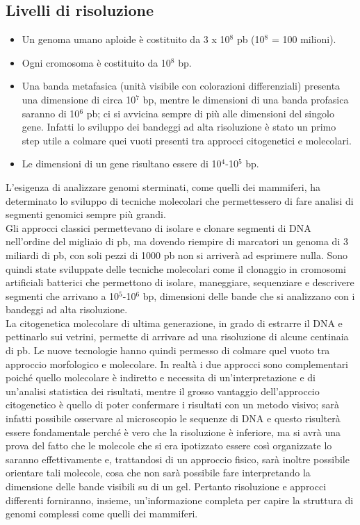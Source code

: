 \documentclass[11pt]{book}
\begin{document}
\subsection{Livelli di risoluzione}
\begin{itemize}
\item 
Un genoma umano aploide è costituito da 3 x 10\(^8\) pb (10\(^8\) = 100 milioni).
\item
Ogni cromosoma è costituito da 10\(^8\) bp.
\item
Una banda metafasica (unità visibile con colorazioni differenziali) presenta una dimensione di circa 10\(^7\) bp, mentre le dimensioni di una banda profasica saranno di 10\(^6\) pb; ci si avvicina sempre di più alle dimensioni del singolo gene.
Infatti lo sviluppo dei bandeggi ad alta risoluzione è stato un primo step utile a colmare quei vuoti presenti tra approcci citogenetici e molecolari.
\item
Le dimensioni di un gene risultano essere di 10\(^4\)-10\(^5\) bp.
\end{itemize}

L’esigenza di analizzare genomi sterminati, come quelli dei mammiferi, ha determinato lo sviluppo di tecniche molecolari che permettessero di fare analisi di segmenti genomici sempre più grandi.\\
Gli approcci classici permettevano di isolare e clonare segmenti di DNA nell’ordine del migliaio di pb, ma dovendo riempire di marcatori un genoma di 3 miliardi di pb, con soli pezzi di 1000 pb non si arriverà ad esprimere nulla. Sono quindi state sviluppate delle tecniche molecolari come il clonaggio in cromosomi artificiali batterici che permettono di isolare, maneggiare, sequenziare e descrivere segmenti che arrivano a 10\(^5\)-10\(^6\) bp, dimensioni delle bande che si analizzano con i bandeggi ad alta risoluzione.\\
La citogenetica molecolare di ultima generazione, in grado di estrarre il DNA e pettinarlo sui vetrini, permette di arrivare ad una risoluzione di alcune centinaia di pb. Le nuove tecnologie hanno quindi permesso di colmare quel vuoto tra approccio morfologico e molecolare. 
In realtà i due approcci sono complementari poiché quello molecolare è indiretto e necessita di un’interpretazione e di un’analisi statistica dei risultati, mentre il grosso vantaggio dell’approccio citogenetico è quello di poter confermare i risultati con un metodo visivo; sarà infatti possibile osservare al microscopio le sequenze di DNA e questo risulterà essere fondamentale perché è vero che la risoluzione è inferiore, ma si avrà una prova del fatto che le molecole che si era ipotizzato essere così organizzate lo saranno effettivamente e, trattandosi di un approccio fisico, sarà inoltre possibile orientare tali molecole, cosa che non sarà possibile fare interpretando la dimensione delle bande visibili su di un gel. 
Pertanto risoluzione e approcci differenti forniranno, insieme, un’informazione completa per capire la struttura di genomi complessi come quelli dei mammiferi.
\end{document}
